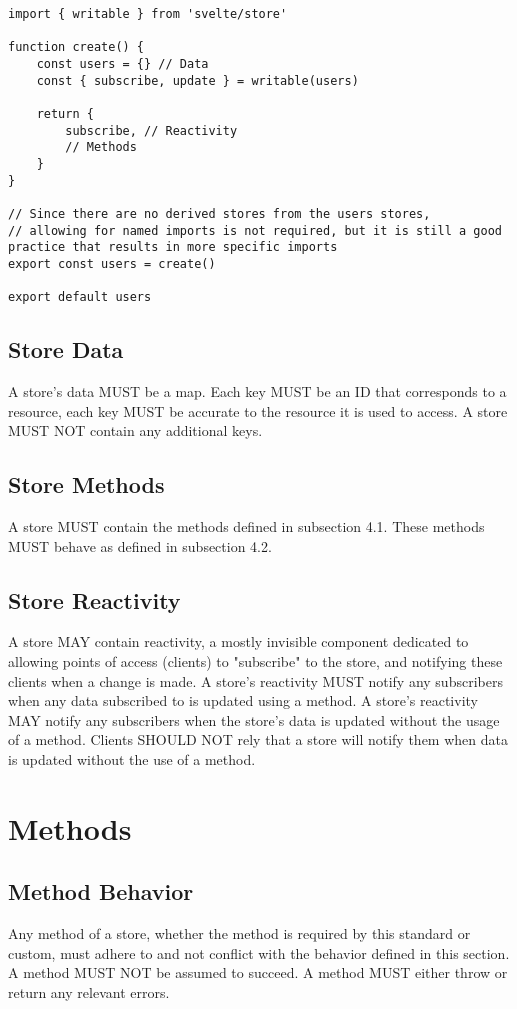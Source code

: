 \documentclass{article}
\begin{document}
\begin{lstlisting}[caption={Store Structure: Data, Reactivity, and Methods}]
import { writable } from 'svelte/store'

function create() {
    const users = {} // Data
    const { subscribe, update } = writable(users)
    
    return {
        subscribe, // Reactivity
        // Methods
    }
}

// Since there are no derived stores from the users stores,
// allowing for named imports is not required, but it is still a good practice that results in more specific imports
export const users = create()

export default users
\end{lstlisting}

\subsection{Store Data}
A store's data MUST be a map. Each key MUST be an ID that corresponds to a resource, each key MUST be accurate to the resource it is used to access. A store MUST NOT contain any additional keys.

\subsection{Store Methods}
A store MUST contain the methods defined in subsection 4.1. These methods MUST behave as defined in subsection 4.2.

\subsection{Store Reactivity}
A store MAY contain reactivity, a mostly invisible component dedicated to allowing points of access (clients) to "subscribe" to the store, and notifying these clients when a change is made. A store's reactivity MUST notify any subscribers when any data subscribed to is updated using a method. A store's reactivity MAY notify any subscribers when the store's data is updated without the usage of a method. Clients SHOULD NOT rely that a store will notify them when data is updated without the use of a method.

\section{Methods}

\subsection{Method Behavior}
Any method of a store, whether the method is required by this standard or custom, must adhere to and not conflict with the behavior defined in this section. A method MUST NOT be assumed to succeed. A method MUST either throw or return any relevant errors.
\end{document}
